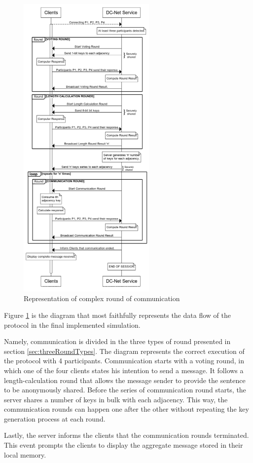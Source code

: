 \begin{figure}[H]
    \centering
    \includegraphics[width=0.6\textwidth]{Images/Design/longRound.png}
    \caption{Representation of complex round of communication}
    \label{fig:longRound}
\end{figure}

Figure \ref{fig:longRound} is the diagram that most faithfully represents the data flow of the protocol in the final implemented simulation. 

Namely, communication is divided in the three types of round presented in section \ref{sec:threeRoundTypes}. The diagram represents the correct execution of the protocol with 4 participants. Communication starts with a voting round, in which one of the four clients states his intention to send a message. It follows a length-calculation round that allows the message sender to provide the sentence to be anonymously shared. Before the series of communication round starts, the server shares a number of keys in bulk with each adjacency. This way, the communication rounds can happen one after the other without repeating the key generation process at each round.

Lastly, the server informs the clients that the communication rounds terminated. This event prompts the clients to display the aggregate message stored in their local memory.
